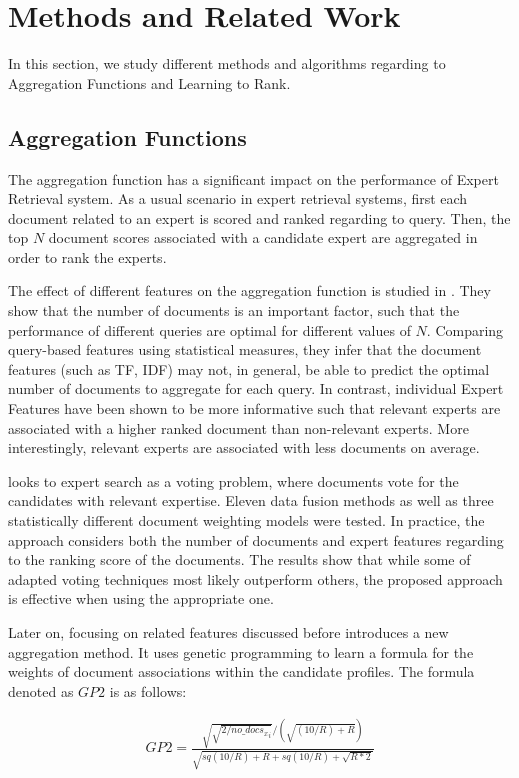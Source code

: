 \section{Methods and Related Work}
\label{sec:methods}
In this section, we study different methods and algorithms regarding to Aggregation Functions and Learning to Rank.

\subsection{Aggregation Functions}
The aggregation function has a significant impact on the performance of Expert Retrieval system. As a usual scenario in expert retrieval systems, first each document related to an expert is scored and ranked regarding to query. Then, the top $N$ document scores associated with a candidate expert are aggregated in order to rank the experts. 

The effect of different features on the aggregation function is studied in \citet{agg-gp2}. They show that the number of documents is an important factor, such that the performance of different queries are optimal for different values of $N$. Comparing query-based features using statistical measures, they infer that the document features (such as TF, IDF) may not, in general, be able to predict the optimal number of documents to aggregate for each query. In contrast, individual Expert Features have been shown to be more informative such that relevant experts are associated with a higher ranked document than non-relevant experts. More interestingly, relevant experts are associated with less documents on average.

\citet{agg-vote} looks to expert search as a voting problem, where documents vote for the candidates with relevant expertise. Eleven data fusion methods as well as three statistically different document weighting models were tested. In practice, the approach considers both the number of documents and expert features regarding to the ranking score of the documents. The results show that while some of adapted voting techniques most likely outperform others, the proposed approach is effective when using the appropriate one.

Later on, focusing on related features discussed before \citet{agg-gp2} introduces a new aggregation method. It uses genetic programming to learn a formula for the weights of document associations within the candidate profiles. The formula denoted as $GP2$ is as follows:

\begin{align*}
GP2 = \frac{\sqrt{\sqrt{2/{no\_docs_x}_i}}/(\sqrt{(10/R)+R})}{\sqrt{sq(10/R)+R+sq(10/R)+\sqrt{R*2}}}
\end{align*}

